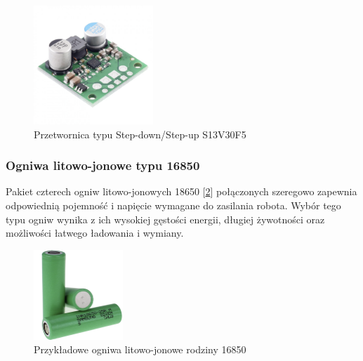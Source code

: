 \begin{figure}[H]
        \centering
        \includegraphics[width=0.4\textwidth]{./graf/step-down.png}
        \caption{Przetwornica typu Step-down/Step-up S13V30F5}
        \label{zdj:step-down}
\end{figure}

\subsubsection*{Ogniwa litowo-jonowe typu 16850}
Pakiet czterech ogniw litowo-jonowych 18650 [\ref{zdj:ogniwa}] połączonych szeregowo zapewnia odpowiednią pojemność i napięcie wymagane do zasilania robota. Wybór tego typu ogniw wynika z ich wysokiej gęstości energii, długiej żywotności oraz możliwości łatwego ładowania i wymiany.

\begin{figure}[H]
        \centering
        \includegraphics[width=0.3\textwidth]{./graf/ogniwa.png}
        \caption{Przykładowe ogniwa litowo-jonowe rodziny 16850}
        \label{zdj:ogniwa}
\end{figure}


